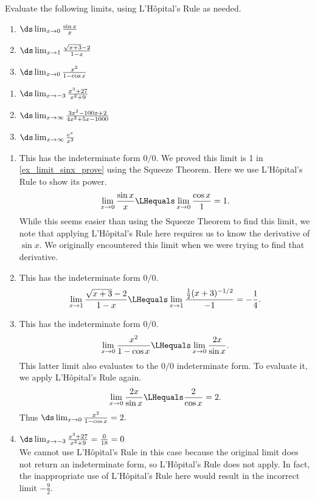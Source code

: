 \begin{example}\label{ex_lhr1}
Evaluate the following limits, using L'Hôpital's Rule as needed.\\
\begin{minipage}[t]{.5\textwidth}
\begin{enumerate}
\item		$\ds \lim_{x\to0}\frac{\sin x}x$
\item		$\ds \lim_{x\to 1}\frac{\sqrt{x+3}-2}{1-x}$
\item		$\ds \lim_{x\to0}\frac{x^2}{1-\cos x}$
\end{enumerate}
\end{minipage}%
\begin{minipage}[t]{.5\textwidth}
\begin{enumerate}\addtocounter{enumi}{3}
	\item	$\ds\lim_{x\to-3}\frac{x^3+27}{x^2+9}$
	\item	$\ds\lim_{x\to\infty}\frac{3x^2-100x+2}{4x^2+5x-1000}$
	\item	$\ds\lim_{x\to\infty}\frac{e^x}{x^3}$
\end{enumerate}
\end{minipage}
\solution
\begin{enumerate}
	\item	This has the indeterminate form $0/0$. We proved this limit is 1 in \autoref{ex_limit_sinx_prove} using the Squeeze Theorem. Here we use L'Hôpital's Rule to show its power.
\[\lim_{x\to0}\frac{\sin x}x \LHequals \lim_{x\to0} \frac{\cos x}{1}=1.\]
While this seems easier than using the Squeeze Theorem to find this limit, we note that applying L'Hôpital's Rule here requires us to know the derivative of $\sin x$. We originally encountered this limit when we were trying to find that derivative.

	\item	This has the indeterminate form $0/0$.
\[\lim_{x\to 1}\frac{\sqrt{x+3}-2}{1-x} 	 \LHequals \lim_{x \to 1} \frac{\frac12(x+3)^{-1/2}}{-1} =-\frac 14.\]

	\item	This has the indeterminate form $0/0$.
\[\lim_{x\to 0}\frac{x^2}{1-\cos x}  \LHequals  \lim_{x\to 0} \frac{2x}{\sin x}.\]
This latter limit also evaluates to the $0/0$ indeterminate form. To evaluate it, we apply L'Hôpital's Rule again.
\[
 \lim_{x\to 0} \frac{2x}{\sin x}
 \LHequals \frac{2}{\cos x} = 2 .
\]
Thus $\ds \lim_{x\to0}\frac{x^2}{1-\cos x}=2.$

	\item \hfill$\ds\lim_{x\to-3}\frac{x^3+27}{x^2+9}
	 =\frac0{18}=0$\hfill\null\smallskip\\
We cannot use L'Hôpital's Rule in this case because the original limit does not return an indeterminate form, so L'Hôpital's Rule does not apply. In fact, the inappropriate use of L'Hôpital's Rule here would result in the incorrect limit $-\frac92$.


\end{enumerate}
\end{example}
